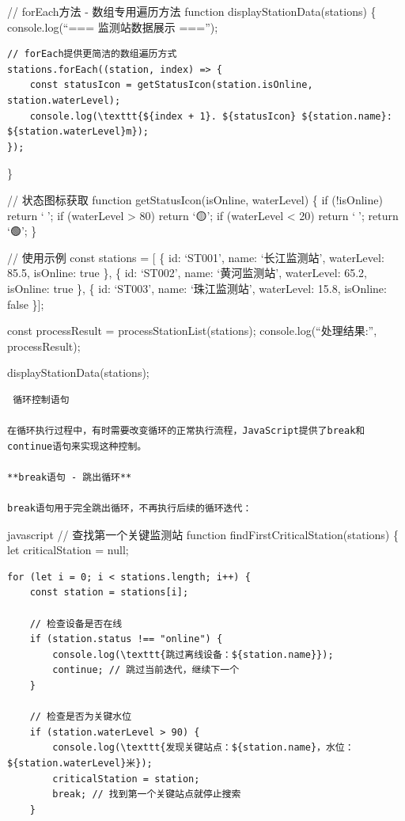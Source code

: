 {// forEach方法 - 数组专用遍历方法 function displayStationData(stations) \{ console.log(``=== 监测站数据展示 ==='');

\begin{verbatim}
// forEach提供更简洁的数组遍历方式
stations.forEach((station, index) => {
    const statusIcon = getStatusIcon(station.isOnline, station.waterLevel);
    console.log(\texttt{${index + 1}. ${statusIcon} ${station.name}: ${station.waterLevel}m});
});
\end{verbatim}

\}

// 状态图标获取 function getStatusIcon(isOnline, waterLevel) \{ if (!isOnline) return `🔴'; if (waterLevel \textgreater{} 80) return `🟡'; if (waterLevel \textless{} 20) return `🔵'; return `🟢'; \}

// 使用示例 const stations = {[} \{ id: `ST001', name: `长江监测站', waterLevel: 85.5, isOnline: true \}, \{ id: `ST002', name: `黄河监测站', waterLevel: 65.2, isOnline: true \}, \{ id: `ST003', name: `珠江监测站', waterLevel: 15.8, isOnline: false \}{]};

const processResult = processStationList(stations); console.log(``处理结果:'', processResult);

displayStationData(stations);

\begin{lstlisting}
 循环控制语句

在循环执行过程中，有时需要改变循环的正常执行流程，JavaScript提供了break和continue语句来实现这种控制。

**break语句 - 跳出循环**

break语句用于完全跳出循环，不再执行后续的循环迭代：
\end{lstlisting}

javascript // 查找第一个关键监测站 function findFirstCriticalStation(stations) \{ let criticalStation = null;

\begin{verbatim}
for (let i = 0; i < stations.length; i++) {
    const station = stations[i];
    
    // 检查设备是否在线
    if (station.status !== "online") {
        console.log(\texttt{跳过离线设备：${station.name}});
        continue; // 跳过当前迭代，继续下一个
    }
    
    // 检查是否为关键水位
    if (station.waterLevel > 90) {
        console.log(\texttt{发现关键站点：${station.name}，水位：${station.waterLevel}米});
        criticalStation = station;
        break; // 找到第一个关键站点就停止搜索
    }
    

\end{verbatim}}
